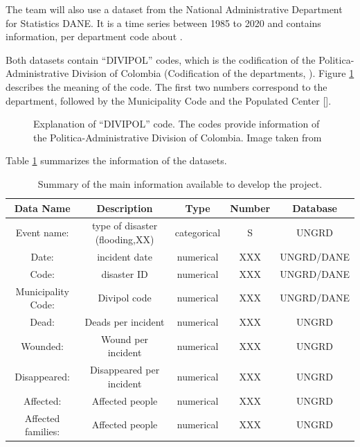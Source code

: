 \documentclass[11pt]{article}
\begin{document}
The team will also use a dataset from the National Administrative Department for Statistics DANE. It is a time series between 1985 to 2020 and contains information, per department code about \cite{DANE} .

Both datasets contain ``DIVIPOL'' codes, which is the codification of the Politica-Administrative Division of Colombia (Codification of the departments, ). Figure \ref{fig:divipol} describes the meaning of the code. The first two numbers correspond to the department, followed by the Municipality Code and the Populated Center [\cite{divipola}].


\begin{figure}[!ht]
        \caption{Explanation of ``DIVIPOL'' code. The codes provide information of the Politica-Administrative Division of Colombia. Image taken from \cite{divipol}}
        \label{fig:divipol}
      \end{figure}


Table \ref{tabDataset} summarizes the information of the datasets.

\begin{table}[h]
\begin{center}
\label{tabDataset}
\begin{tabular}{|c|c|c|c|c|}
\hline
\textbf{Data Name} & \textbf{Description} & \textbf{Type} & \textbf{Number} & \textbf{Database}   \\
\hline
 Event name: & type of disaster (flooding,XX)& categorical &S &  UNGRD\\
 Date: & incident date & numerical &XXX &  UNGRD/DANE  \\
 Code: &disaster ID & numerical &XXX &  UNGRD/DANE  \\
 Municipality Code: & Divipol code & numerical &XXX &  UNGRD/DANE  \\
 Dead: & Deads per incident & numerical &XXX &  UNGRD  \\
 Wounded: & Wound per incident & numerical &XXX &  UNGRD  \\
 Disappeared: & Disappeared per incident & numerical &XXX &  UNGRD  \\
  Affected: & Affected people & numerical &XXX &  UNGRD  \\
   Affected families: & Affected people & numerical &XXX &  UNGRD  \\
\hline
\end{tabular}
 \caption{Summary of the main information available to develop the project.}
\end{center}
\end{table}
\end{document}
